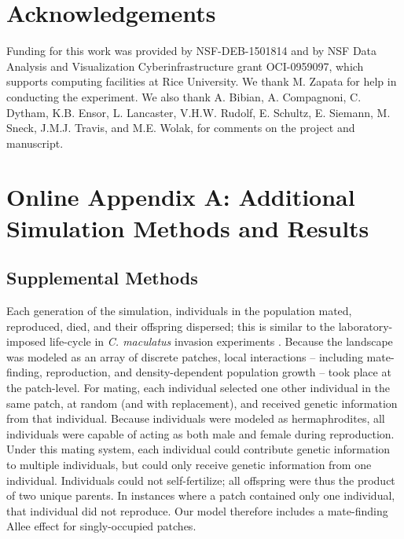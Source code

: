\documentclass[11pt]{article}
\newcommand{\revise}[1]{{\color{Mahogany}{#1}}}
\begin{document}
\section*{Acknowledgements}
Funding for this work was provided by NSF-DEB-1501814 and by NSF Data Analysis and Visualization Cyberinfrastructure grant OCI-0959097, which supports computing facilities at Rice University. We thank M. Zapata for help in conducting the experiment. We also thank A. Bibian, A. Compagnoni, C. Dytham, K.B. Ensor, L. Lancaster, V.H.W. Rudolf, E. Schultz, E. Siemann, M. Sneck, J.M.J. Travis, and M.E. Wolak, \revise{and two anonymous reviewers} for comments on the project and manuscript.

\newpage{}
\section*{Online Appendix A: Additional Simulation Methods and Results}
\subsection*{Supplemental Methods}
Each generation of the simulation, individuals in the population mated, reproduced, died, and their offspring dispersed; this is similar to the laboratory-imposed life-cycle in \textit{C. maculatus} invasion experiments \citep{miller_sex_2013,wagner_genetic_2016,ochocki_rapid_2017}.
Because the landscape was modeled as an array of discrete patches, local interactions -- including mate-finding, reproduction, and density-dependent population growth -- took place at the patch-level.
For mating, each individual selected one other individual in the same patch, at random (and with replacement), and received genetic information from that individual.
Because individuals were modeled as hermaphrodites, all individuals were capable of acting as both male and female during reproduction.
Under this mating system, each individual could contribute genetic information to multiple individuals, but could only receive genetic information from one individual.
Individuals could not self-fertilize; all offspring were thus the product of two unique parents.
In instances where a patch contained only one individual, that individual did not reproduce.
Our model therefore includes a mate-finding Allee effect for singly-occupied patches.
\end{document}
